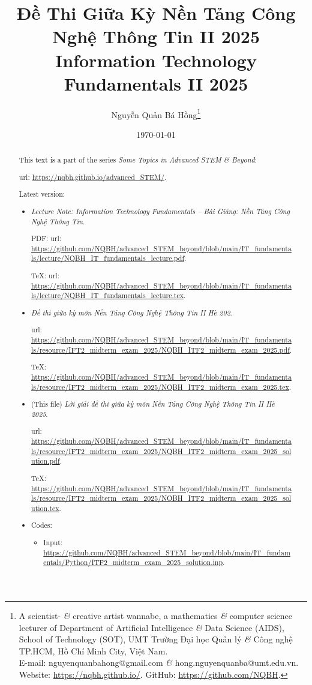 \documentclass{article}
\title{Đề Thi Giữa Kỳ Nền Tảng Công Nghệ Thông Tin II 2025\\Information Technology Fundamentals II 2025}
\author{Nguyễn Quản Bá Hồng\footnote{A scientist- {\it\&} creative artist wannabe, a mathematics {\it\&} computer science lecturer of Department of Artificial Intelligence {\it\&} Data Science (AIDS), School of Technology (SOT), UMT Trường Đại học Quản lý {\it\&} Công nghệ TP.HCM, Hồ Chí Minh City, Việt Nam.\\E-mail: {\sf nguyenquanbahong@gmail.com} {\it\&} {\sf hong.nguyenquanba@umt.edu.vn}. Website: \url{https://nqbh.github.io/}. GitHub: \url{https://github.com/NQBH}.}}
\date{\today}
\begin{document}
\maketitle
\begin{abstract}
    This text is a part of the series {\it Some Topics in Advanced STEM \& Beyond}:
    
    {\sc url}: \url{https://nqbh.github.io/advanced_STEM/}.
    
    Latest version:
    \begin{itemize}
        \item {\it Lecture Note: Information Technology Fundamentals -- Bài Giảng: Nền Tảng Công Nghệ Thông Tin}.
        
        PDF: {\sc url}: \url{https://github.com/NQBH/advanced_STEM_beyond/blob/main/IT_fundamentals/lecture/NQBH_IT_fundamentals_lecture.pdf}.
        
        \TeX: {\sc url}: \url{https://github.com/NQBH/advanced_STEM_beyond/blob/main/IT_fundamentals/lecture/NQBH_IT_fundamentals_lecture.tex}.
        
        \item {\it Đề thi giữa kỳ môn Nền Tảng Công Nghệ Thông Tin II Hè 202}.
        
        {\sc url}: \url{https://github.com/NQBH/advanced_STEM_beyond/blob/main/IT_fundamentals/resource/IFT2_midterm_exam_2025/NQBH_ITF2_midterm_exam_2025.pdf}.
        
        \TeX: \url{https://github.com/NQBH/advanced_STEM_beyond/blob/main/IT_fundamentals/resource/IFT2_midterm_exam_2025/NQBH_ITF2_midterm_exam_2025.tex}.
        
        \item (This file) {\it Lời giải đề thi giữa kỳ môn Nền Tảng Công Nghệ Thông Tin II Hè 2025}.
        
        {\sc url}: \url{https://github.com/NQBH/advanced_STEM_beyond/blob/main/IT_fundamentals/resource/IFT2_midterm_exam_2025/NQBH_ITF2_midterm_exam_2025_solution.pdf}.
        
        \TeX: \url{https://github.com/NQBH/advanced_STEM_beyond/blob/main/IT_fundamentals/resource/IFT2_midterm_exam_2025/NQBH_ITF2_midterm_exam_2025_solution.tex}.
        \item Codes:
        \begin{itemize}
            \item Input: \url{https://github.com/NQBH/advanced_STEM_beyond/blob/main/IT_fundamentals/Python/ITF2_midterm_exam_2025_solution.inp}.
            

\end{itemize}
\end{itemize}
\end{abstract}
\end{document}
